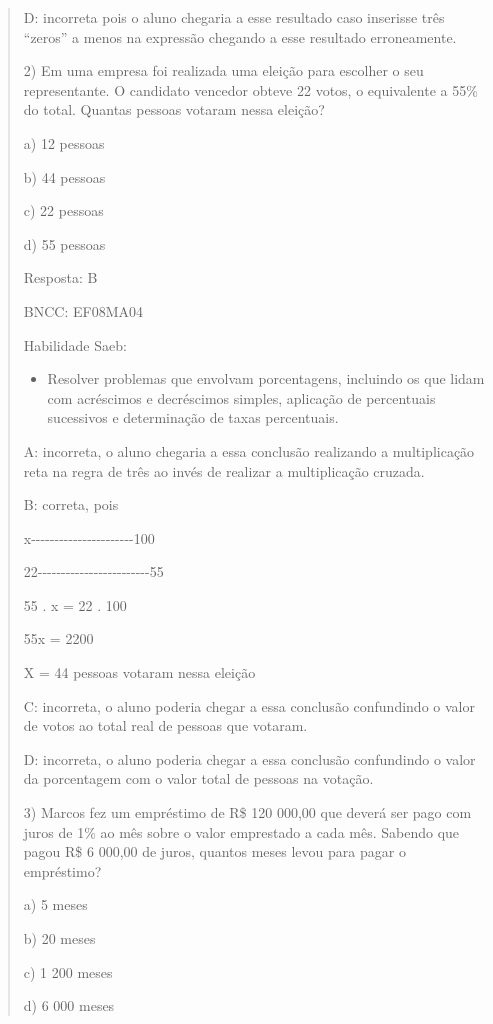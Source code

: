\begin{quote}
\begin{escolha}
D: incorreta pois o aluno chegaria a esse resultado caso inserisse três
``zeros'' a menos na expressão chegando a esse resultado erroneamente.

2) Em uma empresa foi realizada uma eleição para escolher o seu
representante. O candidato vencedor obteve 22 votos, o equivalente a
55\% do total. Quantas pessoas votaram nessa eleição?

a) 12 pessoas

b) 44 pessoas

c) 22 pessoas

d) 55 pessoas

Resposta: B

BNCC: EF08MA04

Habilidade Saeb:

\begin{itemize}
\tightlist
\item
  Resolver problemas que envolvam porcentagens, incluindo os que lidam
  com acréscimos e decréscimos simples, aplicação de percentuais
  sucessivos e determinação de taxas percentuais.
\end{itemize}

A: incorreta, o aluno chegaria a essa conclusão realizando a
multiplicação reta na regra de três ao invés de realizar a multiplicação
cruzada.

B: correta, pois

x-\/-\/-\/-\/-\/-\/-\/-\/-\/-\/-\/-\/-\/-\/-\/-\/-\/-\/-\/-\/-\/-100

22-\/-\/-\/-\/-\/-\/-\/-\/-\/-\/-\/-\/-\/-\/-\/-\/-\/-\/-\/-\/-\/-\/-\/-55

55 . x = 22 . 100

55x = 2200

X = 44 pessoas votaram nessa eleição

C: incorreta, o aluno poderia chegar a essa conclusão confundindo o
valor de votos ao total real de pessoas que votaram.

D: incorreta, o aluno poderia chegar a essa conclusão confundindo o
valor da porcentagem com o valor total de pessoas na votação.

3) Marcos fez um empréstimo de R\$ 120 000,00 que deverá ser pago com
juros de 1\% ao mês sobre o valor emprestado a cada mês. Sabendo que
pagou R\$ 6 000,00 de juros, quantos meses levou para pagar o
empréstimo?

a) 5 meses

b) 20 meses

c) 1 200 meses

d) 6 000 meses


\end{escolha}
\end{quote}
